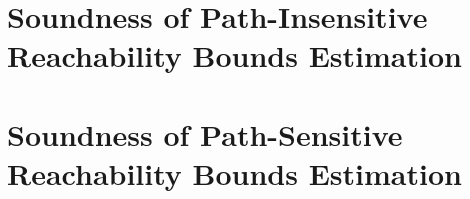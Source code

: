 \documentclass[a4paper,11pt]{article}
\begin{document}
\section{Soundness of Path-Insensitive Reachability Bounds Estimation}
\label{apdx:pathinsensitive_rb_soundness}

\clearpage
\section{Soundness of Path-Sensitive Reachability Bounds Estimation}
\label{apdx:pathsensitive_rb_soundness}


\clearpage


\end{document}
